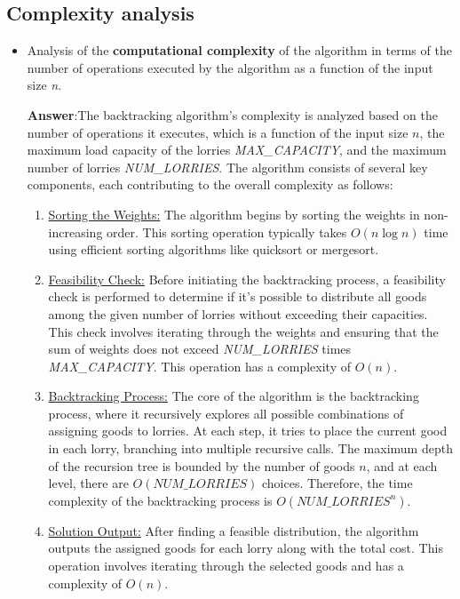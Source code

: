 \documentclass{article}
\begin{document}
\subsection{Complexity analysis}
\begin{itemize}
	\item Analysis of the \textbf{computational complexity} of the algorithm in terms of the number of operations
	      executed by the algorithm as a function of the input size \textit{n}.

	      \textbf{Answer}:\quad The backtracking algorithm's complexity is analyzed based on the number of operations it executes, which is a function of the input size \(n\), the maximum load capacity of the lorries \textit{MAX\_CAPACITY}, and the maximum number of lorries \textit{NUM\_LORRIES}. The algorithm consists of several key components, each contributing to the overall complexity as follows:

	      \begin{enumerate}
		      \item \underline{Sorting the Weights:} The algorithm begins by sorting the weights in non-increasing order.
		            This sorting operation typically takes \(O(n \log n)\) time using efficient sorting algorithms like quicksort or mergesort.

		      \item \underline{Feasibility Check:} Before initiating the backtracking process, a feasibility check is performed to determine
		            if it's possible to distribute all goods among the given number of lorries without exceeding their capacities. This check involves iterating through the weights and ensuring that the sum of weights does not exceed \textit{NUM\_LORRIES} times \textit{MAX\_CAPACITY}. This operation has a complexity of \(O(n)\).

		      \item \underline{Backtracking Process:} The core of the algorithm is the backtracking process, where it recursively
		            explores all possible combinations of assigning goods to lorries. At each step, it tries to place the current good in each lorry,
		            branching into multiple recursive calls. The maximum depth of the recursion tree is bounded by the number of goods \(n\),
		            and at each level, there are \(O(\textit{NUM\_LORRIES})\) choices. Therefore, the time complexity of the backtracking
		            process is \(O(\textit{NUM\_LORRIES}^n)\).

		      \item \underline{Solution Output:} After finding a feasible distribution, the algorithm outputs the assigned goods for each lorry along with the total cost. This operation involves iterating through the selected goods and has a complexity of \(O(n)\).
	      \end{enumerate}


\end{itemize}
\end{document}

